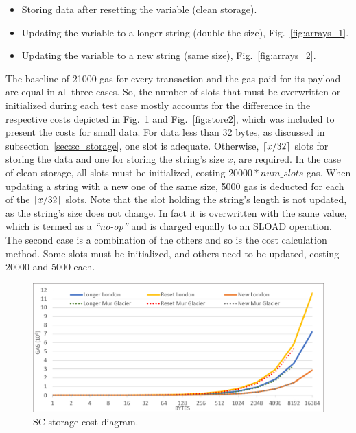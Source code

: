 \begin{itemize}[topsep=0pt, itemsep=0pt]
  \item Storing data after resetting the variable (clean storage).
  \item Updating the variable to a longer string (double the size), Fig.~\ref{fig:arrays_1}.
  \item Updating the variable to a new string (same size), Fig.~\ref{fig:arrays_2}.
\end{itemize}

The baseline of 21000 gas for every transaction and the gas paid for its payload are equal in all three cases. So, the number of slots that must be overwritten or initialized during each test case mostly accounts for the difference in the respective costs depicted in Fig.~\ref{fig:store1} and Fig.~\ref{fig:store2}, which was included to present the costs for small data. For data less than 32 bytes, as discussed in subsection~\ref{sec:sc_storage}, one slot is adequate. Otherwise, \(\ceil*{x/32}\) slots for storing the data and one for storing the string's size \(x\), are required. In the case of clean storage, all slots must be initialized, costing \(20000*num\_slots\) gas. When updating a string with a new one of the same size, 5000 gas is deducted for each of the \(\ceil*{x/32}\) slots. Note that the slot holding the string’s length is not updated, as the string’s size does not change. In fact it is overwritten with the same value, which is termed as a \emph{``no-op''} and is charged equally to an SLOAD operation. The second case is a combination of the others and so is the cost calculation method. Some slots must be initialized, and others need to be updated, costing 20000 and 5000 each.

\begin{figure}[htbp]
\centerline{\includegraphics[width=\textwidth]{figs/store1.pdf}}
\caption{SC storage cost diagram.}
\label{fig:store1}
\end{figure}

